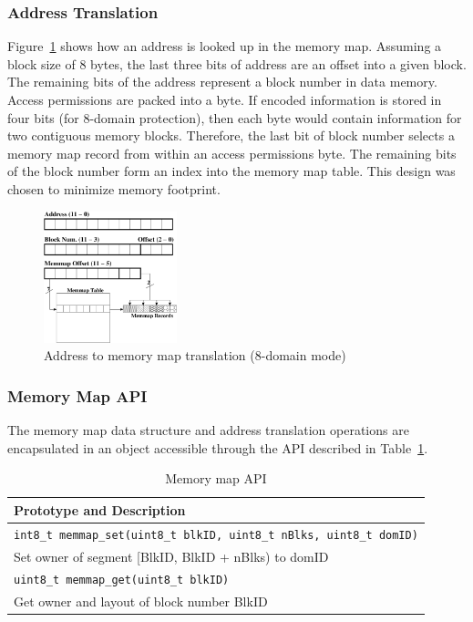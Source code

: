 \subsubsection{Address Translation}
\label{sec:memtrans}
%
Figure~\ref{fig:addr_memmap_translate} shows how an address is looked up in
the memory map.
%
Assuming a block size of 8 bytes, the last three bits of address are an
offset into a given block.
%
The remaining bits of the address represent a block number in data memory.
%
Access permissions are packed into a byte.
%
If encoded information is stored in four bits (for 8-domain
protection), then each byte would contain information for two
contiguous memory blocks.
%
Therefore, the last bit of block number selects a memory map record
from within an access permissions byte.
%
The remaining bits of the block number form an index into the memory map table.
%
This design was chosen to minimize memory footprint.
%
\begin{figure}[htbp]
  \centering
  \includegraphics[height=1.5in,
  keepaspectratio=true]{figures/memaddrtrans.eps}
  \caption{Address to memory map translation (8-domain mode)}
  \label{fig:addr_memmap_translate}
\end{figure}
%
\subsubsection{Memory Map API}
%
The memory map data structure and address translation operations are
encapsulated in an object accessible through the API described
in Table~\ref{tab:memmap_api}. 	
%
%
%
%
%
\begin{table}[htdp]
   \centering
   \small{
   \begin{tabular}{|l|}
   \hline
   Prototype and Description \\
   \hline
   \texttt{int8\_t memmap\_set(uint8\_t blkID, uint8\_t nBlks, uint8\_t
   domID)}\\
   Set owner of segment [BlkID, BlkID + nBlks) to domID \\
   \hline
   \texttt{uint8\_t memmap\_get(uint8\_t blkID)}\\
   Get owner and layout of block number BlkID \\
   \hline
   \end{tabular}
   }
   \centering
   \caption{Memory map API}
   \label{tab:memmap_api}
\end{table}
%
%

